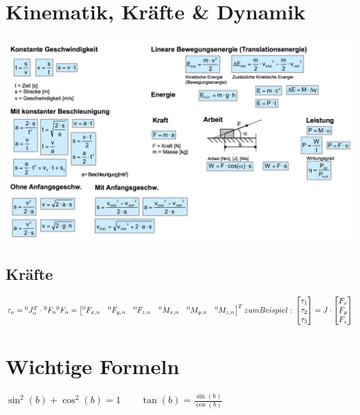 \section{Kinematik, Kräfte \& Dynamik}
\includegraphics[width=17cm]{./bilder/kinematik.png} \\

\subsection{Kräfte}
$\tau_{n}={}^0J^T_n \cdot {}^0F_n  \\ \\
{}^0F_n = \begin{bmatrix} {}^0F_{x,n} & {}^0F_{y,n} & {}^0F_{z,n} & {}^0M_{x,n}
& {}^0M_{y,n} & {}^0M_{z,n}
\end{bmatrix}^{T}  \\ \\
zum Beispiel: \\
\begin{bmatrix}
\tau_{1} \\ \tau_{2} \\ \tau_{3}
\end{bmatrix}          
=  J \cdot
\begin{bmatrix}
F_{x} \\ F_{y} \\ F_{z}
\end{bmatrix}
$


\newpage

\section{Wichtige Formeln}
	$\sin^2(b)+\cos^2(b)=1 \qquad \tan(b)=\frac{\sin(b)}{\cos(b)}$

